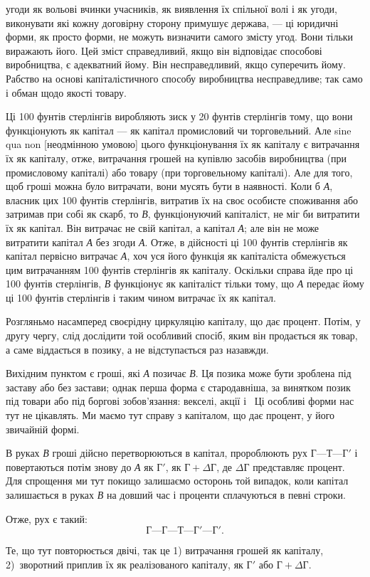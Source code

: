 \parcont{}  %
угоди як вольові вчинки учасників, як виявлення їх спільної
волі і як угоди, виконувати які кожну договірну сторону примушує
держава, — ці юридичні форми, як просто форми, не можуть
визначити самого змісту угод. Вони тільки виражають його.
Цей зміст справедливий, якщо він відповідає способові виробництва,
є адекватний йому. Він несправедливий, якщо суперечить
йому. Рабство на основі капіталістичного способу виробництва
несправедливе; так само і обман щодо якості товару.

Ці 100 фунтів стерлінгів виробляють зиск у 20 фунтів стерлінгів
тому, що вони функціонують як капітал — як капітал
промисловий чи торговельний. Але sine qua non [неодмінною
умовою] цього функціонування їх як капіталу є витрачання їх
як капіталу, отже, витрачання грошей на купівлю засобів виробництва
(при промисловому капіталі) або товару (при торговельному
капіталі). Але для того, щоб гроші можна було витрачати,
вони мусять бути в наявності. Коли б \emph{А}, власник цих
100 фунтів стерлінгів, витратив їх на своє особисте споживання
або затримав при собі як скарб, то \emph{В}, функціонуючий капіталіст,
не міг би витратити їх як капітал. Він витрачає не свій
капітал, а капітал \emph{А}; але він не може витратити капітал \emph{А} без
згоди \emph{А}. Отже, в дійсності ці 100 фунтів стерлінгів як капітал
первісно витрачає \emph{А}, хоч уся його функція як капіталіста обмежується
цим витрачанням 100 фунтів стерлінгів як капіталу.
Оскільки справа йде про ці 100 фунтів стерлінгів, \emph{В} функціонує
як капіталіст тільки тому, що \emph{А} передає йому ці 100 фунтів
стерлінгів і таким чином витрачає їх як капітал.

Розгляньмо насамперед своєрідну циркуляцію капіталу, що
дає процент. Потім, у другу чергу, слід дослідити той особливий
спосіб, яким він продається як товар, а саме віддається
в позику, а не відступається раз назавжди.

Вихідним пунктом є гроші, які \emph{А} позичає \emph{В}. Ця позика може
бути зроблена під заставу або без застави; однак перша форма є
стародавніша, за винятком позик під товари або під боргові
зобов’язання: векселі, акції і~ Ці особливі форми нас тут
не цікавлять. Ми маємо тут справу з капіталом, що дає процент,
у його звичайній формі.

В руках \emph{В} гроші дійсно перетворюються в капітал, пророблюють
рух $Г — Т — Г'$ і повертаються потім знову до \emph{А} як $Г'$,
як $Г + ΔГ$, де $ΔГ$ представляє процент. Для спрощення ми тут
покищо залишаємо осторонь той випадок, коли капітал залишається
в руках \emph{В} на довший час і проценти сплачуються
в певні строки.

Отже, рух є такий: \[
Г — Г — Т — Г' — Г'\text{.}
\]

\noindent{}Те, що тут повторюється двічі, так це 1) витрачання грошей
як капіталу, 2)~зворотний приплив їх як реалізованого
капіталу, як $Г'$ або $Г + ΔГ$.
